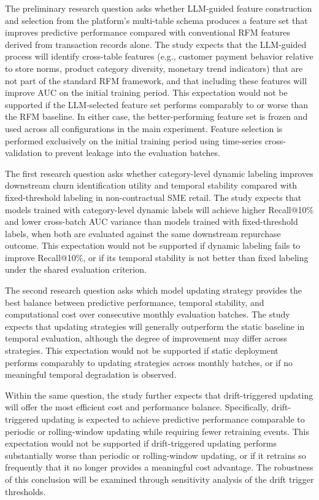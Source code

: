 The preliminary research question asks whether LLM-guided feature construction and selection from the platform's multi-table schema produces a feature set that improves predictive performance compared with conventional RFM features derived from transaction records alone. The study expects that the LLM-guided process will identify cross-table features (e.g., customer payment behavior relative to store norms, product category diversity, monetary trend indicators) that are not part of the standard RFM framework, and that including these features will improve AUC on the initial training period. This expectation would not be supported if the LLM-selected feature set performs comparably to or worse than the RFM baseline. In either case, the better-performing feature set is frozen and used across all configurations in the main experiment. Feature selection is performed exclusively on the initial training period using time-series cross-validation to prevent leakage into the evaluation batches.

The first research question asks whether category-level dynamic labeling improves downstream churn identification utility and temporal stability compared with fixed-threshold labeling in non-contractual SME retail. The study expects that models trained with category-level dynamic labels will achieve higher Recall@10\% and lower cross-batch AUC variance than models trained with fixed-threshold labels, when both are evaluated against the same downstream repurchase outcome. This expectation would not be supported if dynamic labeling fails to improve Recall@10\%, or if its temporal stability is not better than fixed labeling under the shared evaluation criterion.

The second research question asks which model updating strategy provides the best balance between predictive performance, temporal stability, and computational cost over consecutive monthly evaluation batches. The study expects that updating strategies will generally outperform the static baseline in temporal evaluation, although the degree of improvement may differ across strategies. This expectation would not be supported if static deployment performs comparably to updating strategies across monthly batches, or if no meaningful temporal degradation is observed.

Within the same question, the study further expects that drift-triggered updating will offer the most efficient cost and performance balance. Specifically, drift-triggered updating is expected to achieve predictive performance comparable to periodic or rolling-window updating while requiring fewer retraining events. This expectation would not be supported if drift-triggered updating performs substantially worse than periodic or rolling-window updating, or if it retrains so frequently that it no longer provides a meaningful cost advantage. The robustness of this conclusion will be examined through sensitivity analysis of the drift trigger thresholds.

